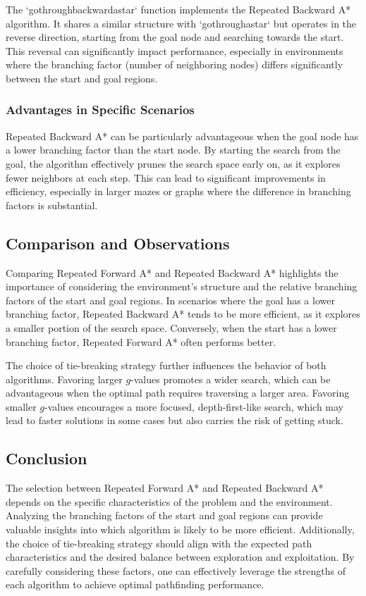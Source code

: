 \documentclass[12pt]{article}
\begin{document}
The `gothroughbackwardastar` function implements the Repeated Backward A* algorithm. It shares a similar structure with `gothroughastar` but operates in the reverse direction, starting from the goal node and searching towards the start. This reversal can significantly impact performance, especially in environments where the branching factor (number of neighboring nodes) differs significantly between the start and goal regions.

\subsubsection{Advantages in Specific Scenarios}

Repeated Backward A* can be particularly advantageous when the goal node has a lower branching factor than the start node. By starting the search from the goal, the algorithm effectively prunes the search space early on, as it explores fewer neighbors at each step. This can lead to significant improvements in efficiency, especially in larger mazes or graphs where the difference in branching factors is substantial.

\subsection{Comparison and Observations}

Comparing Repeated Forward A* and Repeated Backward A* highlights the importance of considering the environment's structure and the relative branching factors of the start and goal regions. In scenarios where the goal has a lower branching factor, Repeated Backward A* tends to be more efficient, as it explores a smaller portion of the search space. Conversely, when the start has a lower branching factor, Repeated Forward A* often performs better.

The choice of tie-breaking strategy further influences the behavior of both algorithms. Favoring larger $g$-values promotes a wider search, which can be advantageous when the optimal path requires traversing a larger area. Favoring smaller $g$-values encourages a more focused, depth-first-like search, which may lead to faster solutions in some cases but also carries the risk of getting stuck.

\subsection{Conclusion}

The selection between Repeated Forward A* and Repeated Backward A* depends on the specific characteristics of the problem and the environment. Analyzing the branching factors of the start and goal regions can provide valuable insights into which algorithm is likely to be more efficient. Additionally, the choice of tie-breaking strategy should align with the expected path characteristics and the desired balance between exploration and exploitation. By carefully considering these factors, one can effectively leverage the strengths of each algorithm to achieve optimal pathfinding performance. 
\end{document}

